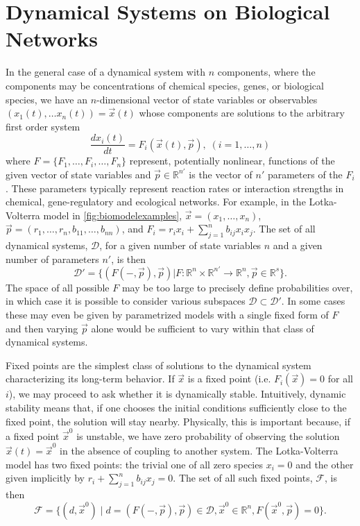 \section{Dynamical Systems on Biological Networks}

In the general case of a dynamical system with $n$ components, where the components may be concentrations of chemical species, genes, or biological species, we have an $n$-dimensional vector of state variables or observables $(x_1(t), \ldots x_n(t)) = \vec{x}(t)
$
whose components are solutions to the arbitrary first order system
\begin{equation}\label{eq:eom}
\frac{dx_i(t)}{dt} = F_i(\vec{x}(t), \vec{p}), \; (i=1,\ldots,n)
\end{equation}
where $F=\{F_1,\ldots,F_i,\ldots,F_n\}$ represent, potentially nonlinear, functions of the given vector of state variables and $\vec{p} \in \mathbb{R}^{n'}$ is the vector of $n'$ parameters of the $F_i$. These parameters typically represent reaction rates or interaction strengths in chemical, gene-regulatory and ecological networks. For example, in the Lotka-Volterra model in \ref{fig:biomodelexamples}, $\vec{x} = (x_1, \ldots, x_n)$, $\vec{p}=(r_1,\ldots,r_n,b_{11},\ldots,b_{nn})$, and $F_i = r_i x_i + \sum_{j=1}^{n} b_{ij} x_i x_j$. The set of all dynamical systems, $\mathcal{D}$, for a given number of state variables $n$ and a given number of parameters $n'$, is then
\begin{equation}\label{eq:setdynsys}
\mathcal{D'} = \{ (F(-,\vec{p}),\vec{p}) | F \colon \mathbb{R}^n \times \mathbb{R}^{n'} \rightarrow \mathbb{R}^n, \vec{p} \in \mathbb{R}^s \}.
\end{equation}
The space of all possible $F$ may be too large to precisely define probabilities over, in which case it is possible to consider various subspaces $\mathcal{D} \subset \mathcal{D}'$. In some cases these may even be given by parametrized models with a single fixed form of $F$ and then varying $\vec{p}$ alone would be sufficient to vary within that class of dynamical systems.

Fixed points are the simplest class of solutions to the dynamical system characterizing its long-term behavior. If $\vec x$ is a fixed point (i.e. $F_i(\vec{x})=0$ for all $i$), we
may proceed to ask whether it is dynamically stable.
Intuitively, dynamic stability means that, if one chooses the initial
conditions sufficiently close to the fixed point, the solution will
stay nearby.  Physically, this is important because,
if a fixed point ${\vec x}^0$ is unstable, we have zero probability of
observing the solution ${\vec x}(t) = {\vec x}^0$ in the absence of coupling to another system. The Lotka-Volterra model has two fixed points: the trivial one of all zero species $x_i=0$ and the other given implicitly by $r_i + \sum_{j=1}^{n} b_{ij} x_j = 0$. The set of all such fixed points, $\mathcal{F}$, is then
\begin{equation}\label{eq:setfixedpoints}
\mathcal{F} = \{ (d,\vec{x}^0) \; | \; d=(F(-,\vec{p}),\vec{p}) \in \mathcal{D}, \vec{x}^0 \in \mathbb{R}^n,F(\vec{x}^0,\vec{p})=0 \}.
\end{equation}

